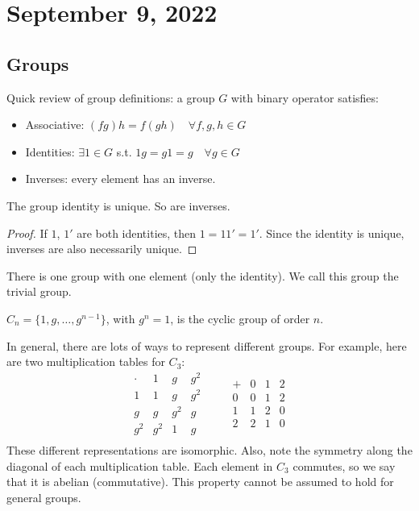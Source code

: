 \section{September 9, 2022}
\subsection{Groups}

Quick review of group definitions: a group $G$ with binary operator satisfies:
\begin{itemize}
    \item Associative: $(fg)h=f(gh)\quad \forall f,g,h\in G$
    \item Identities: $\exists 1\in G$ s.t. $1g=g1=g\quad \forall g\in G$
    \item Inverses: every element has an inverse.
\end{itemize}

\begin{theorem}
\proplabel

The group identity is unique. So are inverses.
\end{theorem}

\begin{proof}
If $1$, $1'$ are both identities, then $1=11'=1'$. Since the identity is unique, inverses are also necessarily unique.
\end{proof}

\begin{definition}

There is one group with one element (only the identity). We call this group the \ac{trivial group}. 
\end{definition}

\begin{definition}

$C_n = \{1,g,\hdots, g^{n-1}\}$, with $g^n=1$, is the \ac{cyclic group} of order $n$. 
\end{definition}

In general, there are lots of ways to represent different groups. For example, here are two multiplication tables for $C_3$:
\[\begin{array}{c|ccc}
     \cdot &1&g&g^2\\
     \hline
     1&1&g&g^2\\
     g&g&g^2&g\\
     g^2&g^2&1&g\\
\end{array}\qquad 
\begin{array}{c|ccc}
     + &0&1&2\\
     \hline
     0&0&1&2\\
     1&1&2&0\\
     2&2&1&0\\
\end{array}
\]
These different representations are \ac{isomorphic}. Also, note the symmetry along the diagonal of each multiplication table. Each element in $C_3$ commutes, so we say that it is \ac{abelian} (commutative). This property cannot be assumed to hold for general groups.

